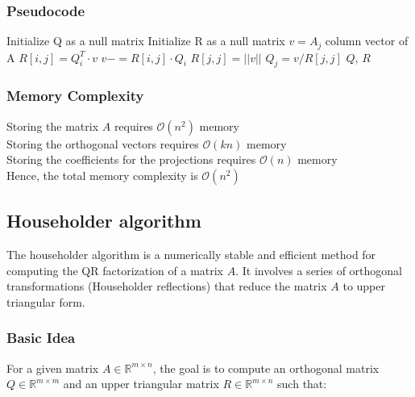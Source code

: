 \documentclass[final]{article}
\begin{document}
            \subsubsection{Pseudocode}
            \begin{algorithm}
                \begin{algorithmic}
                    \State Initialize Q as a null matrix
                    \State Initialize R as a null matrix
                        $v = A_j$ column vector of A
                            \State $R[i, j] = Q_i^{T} \cdot v$
                            \State $v -= R[i,j] \cdot Q_i$
                        \EndFor
                        \State $R[j,j] = ||v||$
                        \State $Q_j = v/R[j,j]$
                    \EndFor
                \return $Q$, $R$
                \end{algorithmic}
            \end{algorithm}
            \subsubsection{Memory Complexity}
            Storing the matrix $ A $ requires $ \mathcal{O}(n^2) $ memory \\
Storing the orthogonal vectors requires $ \mathcal{O}(kn) $ memory \\
Storing the coefficients for the projections requires $ \mathcal{O}(n) $ memory \\
Hence, the total memory complexity is $ \mathcal{O}(n^2) $

    \subsection{Householder algorithm} 
    The householder algorithm is a numerically stable and efficient method for computing the QR factorization of a matrix $ A $. It involves a series of orthogonal transformations (Householder reflections) that reduce the matrix $ A $ to upper triangular form.
\subsubsection{Basic Idea}

For a given matrix $ A \in \mathbb{R}^{m \times n} $, the goal is to compute an orthogonal matrix $ Q \in \mathbb{R}^{m \times m} $ and an upper triangular matrix $ R \in \mathbb{R}^{m \times n} $ such that:
\end{document}
